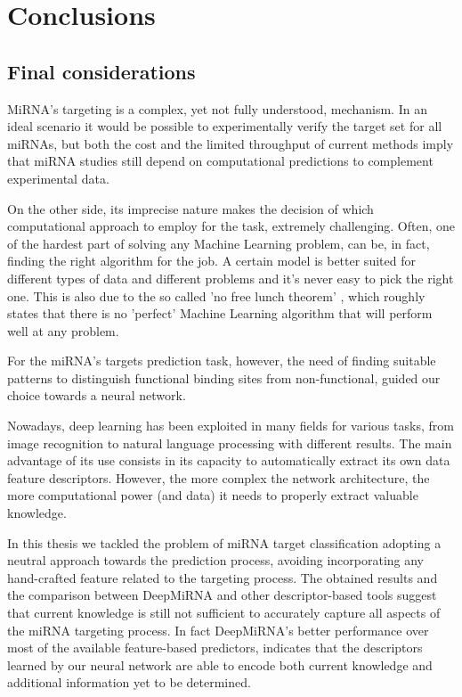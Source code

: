 
\chapter{Conclusions} %

\label{Chapter6} %

\section{Final considerations}
MiRNA's targeting is a complex, yet not fully understood, mechanism. In an ideal scenario it would be possible to experimentally verify the target set for all miRNAs, but both the cost and the limited throughput of current methods imply that miRNA studies still depend on computational predictions to complement experimental data.

On the other side, its imprecise nature makes the decision of which computational approach to employ for the task, extremely challenging. Often, one of the hardest part of solving any Machine Learning problem, can be, in fact, finding the right algorithm for the job. A certain model is better suited for different types of data and different problems and it's never easy to pick the right one. This is also due to the so called 'no free lunch theorem' \cite{nfl}, which roughly states that there is no 'perfect' Machine Learning algorithm that will perform well at any problem.

For the miRNA's targets prediction task, however, the need of finding suitable patterns to distinguish functional binding sites from non-functional, guided our choice towards a  neural network. 

Nowadays, deep learning has been exploited in many fields for various tasks, from image recognition to natural language processing with different results. The main advantage of its use consists in its capacity to automatically extract its own data feature descriptors. However, the more complex the network architecture, the more computational power (and data) it needs to properly extract valuable knowledge.

In this thesis we tackled the problem of miRNA target classification adopting a neutral approach towards the prediction process, avoiding incorporating any hand-crafted feature related to the targeting process. The obtained results and the comparison between DeepMiRNA and other descriptor-based tools suggest that current knowledge is still not sufficient to accurately capture all aspects of the miRNA targeting process. In fact DeepMiRNA's better performance over most of the available feature-based predictors, indicates that the descriptors learned by our neural network are able to encode both current knowledge and additional information yet to be determined.   

